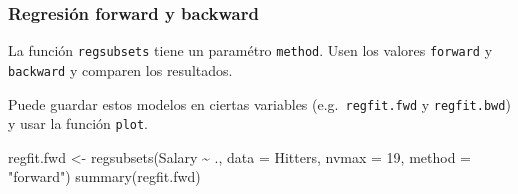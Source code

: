 \documentclass[
  12pt,
]{book}
\newenvironment{Shaded}{\begin{snugshade}}{\end{snugshade}}
\newcommand{\AttributeTok}[1]{\textcolor[rgb]{0.77,0.63,0.00}{#1}}
\newcommand{\DecValTok}[1]{\textcolor[rgb]{0.00,0.00,0.81}{#1}}
\newcommand{\FunctionTok}[1]{\textcolor[rgb]{0.00,0.00,0.00}{#1}}
\newcommand{\NormalTok}[1]{#1}
\newcommand{\OtherTok}[1]{\textcolor[rgb]{0.56,0.35,0.01}{#1}}
\newcommand{\SpecialCharTok}[1]{\textcolor[rgb]{0.00,0.00,0.00}{#1}}
\newcommand{\StringTok}[1]{\textcolor[rgb]{0.31,0.60,0.02}{#1}}
\begin{document}
\hypertarget{regresiuxf3n-forward-y-backward}{%
\subsubsection{Regresión forward y
backward}\label{regresiuxf3n-forward-y-backward}}

La función \texttt{regsubsets} tiene un paramétro \texttt{method}. Usen
los valores \texttt{forward} y \texttt{backward} y comparen los
resultados.

Puede guardar estos modelos en ciertas variables
(e.g.~\texttt{regfit.fwd} y \texttt{regfit.bwd}) y usar la función
\texttt{plot}.

\begin{Shaded}
\begin{Highlighting}[]
\NormalTok{regfit.fwd }\OtherTok{\textless{}{-}} \FunctionTok{regsubsets}\NormalTok{(Salary }\SpecialCharTok{\textasciitilde{}}\NormalTok{ ., }\AttributeTok{data =}\NormalTok{ Hitters,}
    \AttributeTok{nvmax =} \DecValTok{19}\NormalTok{, }\AttributeTok{method =} \StringTok{"forward"}\NormalTok{)}
\FunctionTok{summary}\NormalTok{(regfit.fwd)}
\end{Highlighting}
\end{Shaded}
\end{document}
